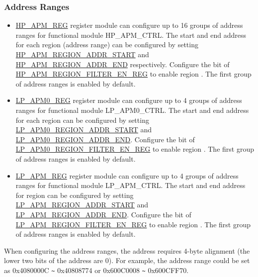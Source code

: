 \documentclass[main\_\_EN.tex]{subfiles}
\begin{document}
\subsubsection{Address Ranges}

\begin{itemize}
    \item \hyperref[sec:permctrl-reg-hp]{HP\_APM\_REG} register module can configure up to 16 groups of address ranges for functional module HP\_APM\_CTRL. The start and end address for each region (address range) can be configured by setting  \hyperref[regdesc:HPAPMREGION0ADDRSTARTREG]{HP\_APM\_REGION\_ADDR\_START} and \hyperref[regdesc:HPAPMREGION0ADDRENDREG]{HP\_APM\_REGION\_ADDR\_END} respectively. Configure the bit  of \hyperref[fielddesc:HPAPMREGIONFILTEREN]{HP\_APM\_REGION\_FILTER\_EN\_REG} to enable region . The first group of address ranges is enabled by default.
    

    \item \hyperref[sec:permctrl-reg-lp0]{LP\_APM0\_REG} register module can configure up to 4 groups of address ranges for functional module LP\_APM0\_CTRL. The start and end address for each region can be configured by setting \hyperref[fielddesc:LPAPM0REGION0ADDRSTART]{LP\_APM0\_REGION\_ADDR\_START} and \hyperref[fielddesc:LPAPM0REGION0ADDREND]{LP\_APM0\_REGION\_ADDR\_END}. Configure the bit  of \hyperref[fielddesc:LPAPM0REGIONFILTEREN]{LP\_APM0\_REGION\_FILTER\_EN\_REG} to enable region . The first group of address ranges is enabled by default.
    
    \item \hyperref[sec:permctrl-reg-lp]{LP\_APM\_REG} register module can configure up to 4 groups of address ranges for functional module LP\_APM\_CTRL. The start and end address for region  can be configured by setting \hyperref[fielddesc:LPAPMREGION0ADDRSTART]{LP\_APM\_REGION\_ADDR\_START} and \hyperref[fielddesc:LPAPMREGION0ADDREND]{LP\_APM\_REGION\_ADDR\_END}. Configure the bit  of \hyperref[fielddesc:LPAPMREGIONFILTEREN]{LP\_APM\_REGION\_FILTER\_EN\_REG} to enable region . The first group of address ranges is enabled by default.
   
\end{itemize}

When configuring the address ranges, the address requires 4-byte alignment (the lower two bits of the address are 0). For example, the address range could be set as 0x4080000C \verb+~+  0x40808774 or 0x600C0008 \verb+~+ 0x600CFF70.
\end{document}
